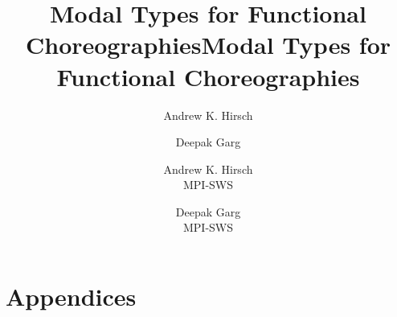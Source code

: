 \documentclass[onecolumn,11pt]{article}
\title{Modal Types for Functional Choreographies}
\author{Andrew K. Hirsch}
\affiliation{
    \institution{MPI-SWS}
    \city{Saarbr\"ucken}
    \country{Germany}
  }
\author{Deepak Garg}
\affiliation{
    \institution{MPI-SWS}
    \city{Saarbr\"ucken}
    \country{Germany}
  }
\title{Modal Types for Functional Choreographies}
\author{}
\author{
      Andrew K. Hirsch\\[-1pt]
      {\normalsize{MPI-SWS}}\\[-1pt]
      {\normalsize{\email{akhirsch@mpi-sws.org}}}
      \and
      Deepak Garg\\[-1pt]
      {\normalsize{MPI-SWS}}\\[-1pt]
      {\normalsize{\email{dg@mpi-sws.org}}}
    }
\date{}
\begin{document}
\ifPACM
  \begin{abstract}
    
  \end{abstract}

  \maketitle
\else
  \maketitle
  \begin{abstract}
    
  \end{abstract}
\fi


\iftr
  

  \appendix
  
\else\ifPACM
  \appendix
  \section*{Appendices}

  

  
\else
  
\fi\fi
\end{document}
